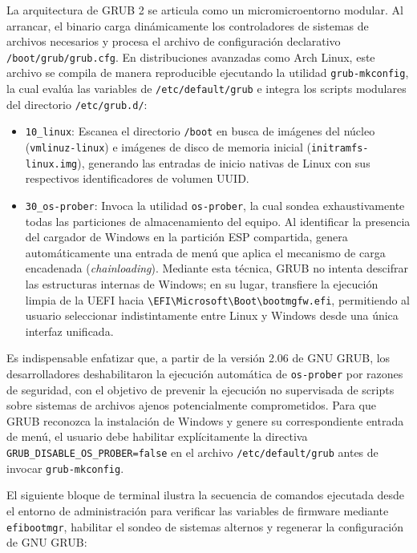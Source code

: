 \documentclass[12pt]{article}
\begin{document}
La arquitectura de GRUB 2 se articula como un micromicroentorno modular. Al arrancar, el binario carga dinámicamente los controladores de sistemas de archivos necesarios y procesa el archivo de configuración declarativo \texttt{/boot/grub/grub.cfg}. En distribuciones avanzadas como Arch Linux, este archivo se compila de manera reproducible ejecutando la utilidad \texttt{grub-mkconfig}, la cual evalúa las variables de \texttt{/etc/default/grub} e integra los scripts modulares del directorio \texttt{/etc/grub.d/}:
\begin{itemize}[noitemsep, topsep=2pt]
    \item \texttt{10\_linux}: Escanea el directorio \texttt{/boot} en busca de imágenes del núcleo (\texttt{vmlinuz-linux}) e imágenes de disco de memoria inicial (\texttt{initramfs-linux.img}), generando las entradas de inicio nativas de Linux con sus respectivos identificadores de volumen UUID.
    \item \texttt{30\_os-prober}: Invoca la utilidad \texttt{os-prober}, la cual sondea exhaustivamente todas las particiones de almacenamiento del equipo. Al identificar la presencia del cargador de Windows en la partición ESP compartida, genera automáticamente una entrada de menú que aplica el mecanismo de carga encadenada (\textit{chainloading}). Mediante esta técnica, GRUB no intenta descifrar las estructuras internas de Windows; en su lugar, transfiere la ejecución limpia de la UEFI hacia \texttt{\textbackslash EFI\textbackslash Microsoft\textbackslash Boot\textbackslash bootmgfw.efi}, permitiendo al usuario seleccionar indistintamente entre Linux y Windows desde una única interfaz unificada.
\end{itemize}

Es indispensable enfatizar que, a partir de la versión 2.06 de GNU GRUB, los desarrolladores deshabilitaron la ejecución automática de \texttt{os-prober} por razones de seguridad, con el objetivo de prevenir la ejecución no supervisada de scripts sobre sistemas de archivos ajenos potencialmente comprometidos. Para que GRUB reconozca la instalación de Windows y genere su correspondiente entrada de menú, el usuario debe habilitar explícitamente la directiva \texttt{GRUB\_DISABLE\_OS\_PROBER=false} en el archivo \texttt{/etc/default/grub} antes de invocar \texttt{grub-mkconfig}.

El siguiente bloque de terminal ilustra la secuencia de comandos ejecutada desde el entorno de administración para verificar las variables de firmware mediante \texttt{efibootmgr}, habilitar el sondeo de sistemas alternos y regenerar la configuración de GNU GRUB:
\end{document}
